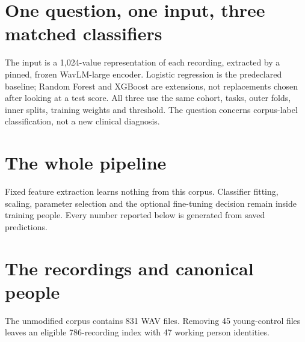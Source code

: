 \documentclass[11pt,a4paper]{article}
\begin{document}
\section{One question, one input, three matched classifiers}
The input is a 1,024-value representation of each recording, extracted by a pinned,
frozen WavLM-large encoder. Logistic regression is the predeclared baseline;
Random Forest and XGBoost are extensions, not replacements chosen after looking
at a test score. All three use the same cohort, tasks, outer folds, inner splits,
training weights and threshold. The question concerns corpus-label classification,
not a new clinical diagnosis.
\clearpage\section{The whole pipeline}
\begin{center}\end{center}
Fixed feature extraction learns nothing from this corpus. Classifier fitting,
scaling, parameter selection and the optional fine-tuning decision remain inside
training people. Every number reported below is generated from saved predictions.
\clearpage\section{The recordings and canonical people}
The unmodified corpus contains 831 WAV files. Removing 45 young-control files
leaves an eligible 786-recording index with 47 working person identities.
\end{document}
